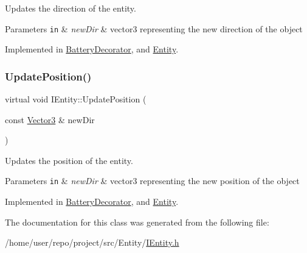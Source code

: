 Updates the direction of the entity. 


\begin{DoxyParams}[1]{Parameters}
\mbox{\tt in}  & {\em new\+Dir} & vector3 representing the new direction of the object \\
\hline
\end{DoxyParams}


Implemented in \hyperlink{classBatteryDecorator_a42dfc0dc6cd4423f8113609ea7f5e938}{Battery\+Decorator}, and \hyperlink{classEntity_a6ae8474b6eb3684f3977dcb5406a3d11}{Entity}.

\mbox{\label{classIEntity_ad30f6845c8747534e7607ca97addbdc6}} 
\subsubsection{\texorpdfstring{Update\+Position()}{UpdatePosition()}}
{\footnotesize\ttfamily virtual void I\+Entity\+::\+Update\+Position (\begin{DoxyParamCaption}\item[{const \hyperlink{classVector3}{Vector3} \&}]{new\+Dir }\end{DoxyParamCaption})\hspace{0.3cm}{\ttfamily [pure virtual]}}



Updates the position of the entity. 


\begin{DoxyParams}[1]{Parameters}
\mbox{\tt in}  & {\em new\+Dir} & vector3 representing the new position of the object \\
\hline
\end{DoxyParams}


Implemented in \hyperlink{classBatteryDecorator_a7c338ca278f03c5c0fcea39885fc7d43}{Battery\+Decorator}, and \hyperlink{classEntity_ab58e8c31ba272bdd1e945130af43493f}{Entity}.



The documentation for this class was generated from the following file\+:\begin{DoxyCompactItemize}
\item 
/home/user/repo/project/src/\+Entity/\hyperlink{IEntity_8h}{I\+Entity.\+h}\end{DoxyCompactItemize}
